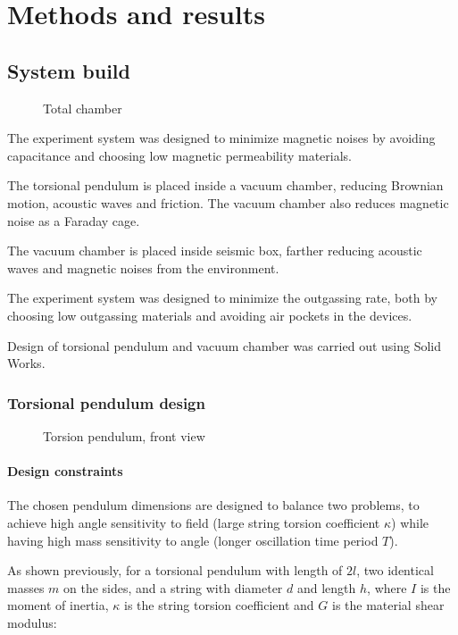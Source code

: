 \documentclass[\main/master.tex]{subfiles}
\begin{document}
\chapter{Methods and results}\label{chapter:Methods and results}

\section{System build}
\begin{figure}[htbp]
	\centering
	\caption[Total chamber]{Total chamber}
	\label{fig:Total chamber}
\end{figure}
\FloatBarrier
\par\noindent
The experiment system was designed to minimize magnetic noises by avoiding capacitance and choosing low magnetic permeability materials.
\par\noindent
The torsional pendulum is placed inside a vacuum chamber, reducing Brownian motion, acoustic waves and friction. The vacuum chamber also reduces magnetic noise as a Faraday cage.
\par\noindent
The vacuum chamber is placed inside seismic box, farther reducing acoustic waves and magnetic noises from the environment.

\par\noindent
The experiment system was designed to minimize the outgassing rate, both by choosing low outgassing materials and avoiding air pockets in the devices. 
\par\noindent
Design of torsional pendulum and vacuum chamber was carried out using Solid Works.

\subsection{Torsional pendulum design}
\begin{figure}[htbp]
	\centering
	\caption[Torsion pendulum, front view]{Torsion pendulum, front view}
	\label{fig:pendulum front}
\end{figure}
\FloatBarrier
\subsubsection{Design constraints}
\par\noindent
The chosen pendulum dimensions are designed to balance two problems, to achieve high angle sensitivity to field (large string torsion coefficient $\kappa$) while having high mass sensitivity to angle (longer oscillation time period $T$). 
\par\noindent
As shown previously, for a torsional pendulum with length of $2l$, two identical masses $m$ on the sides, and a string with diameter $d$ and length $h$, where $I$ is the moment of inertia, $\kappa$ is the string torsion coefficient and $G$ is the material shear modulus:
\end{document}
